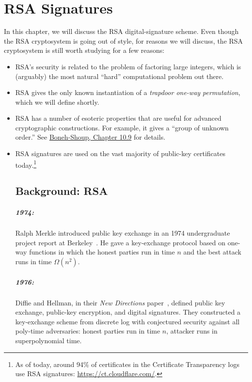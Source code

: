 
\chapter{RSA Signatures}

In this chapter, we will discuss the RSA digital-signature scheme.
%
Even though the RSA cryptosystem is going out of style, for reasons
we will discuss, the RSA cryptosystem is still worth studying for a few reasons:
\begin{itemize}
  \item RSA's security is related to the problem of factoring large integers,
        which is (arguably) the most natural ``hard'' computational problem
        out there.
       
  \item RSA gives the only known instantiation of a \emph{trapdoor one-way permutation},
        which we will define shortly.

  \item RSA has a number of esoteric properties that are useful for advanced
        cryptographic constructions. For example, it gives a ``group of unknown order.''
        See
    \href{https://toc.cryptobook.us/book.pdf#page=436}{Boneh-Shoup, Chapter 10.9} for details.

  \item RSA signatures are used on the vast majority of public-key certificates today.\footnote{As
    of today, around 94\% of certificates in the Certificate Transparency logs use RSA signatures:
\url{https://ct.cloudflare.com/}.}

\section{Background: RSA}
\paragraph{1974:} Ralph Merkle introduced public key exchange in an 1974
        undergraduate project report at Berkeley~\autocite{M78}.
        He gave a key-exchange protocol based on one-way functions in
        which the honest parties run in time $n$ and the best attack
        runs in time $\Omega(n^2)$.

\paragraph{1976:} Diffie and Hellman, in their \emph{New Directions} paper~\autocite{DH76},
        defined public key exchange, public-key encryption, and digital signatures.
        They constructed a key-exchange scheme from discrete log with conjectured security
        against all poly-time adversaries: honest parties run in time $n$, 
        attacker runs in superpolynomial time.


\end{itemize}
